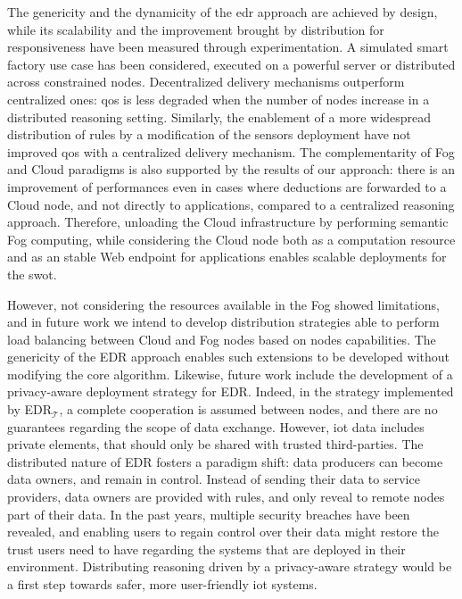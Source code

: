 \documentclass{iosart2c}
\newcommand{\edr}{EDR\xspace}
\newcommand{\edrt}{EDR$_{\mathcal{T}}$\xspace}
\begin{document}
The genericity and the dynamicity of the \gls{edr} approach are achieved by design, while its scalability and the improvement brought by distribution for responsiveness have been measured through experimentation.
A simulated smart factory use case has been considered, executed on a powerful server or distributed across constrained nodes.
Decentralized delivery mechanisms outperform centralized ones: \gls{qos} is less degraded when the number of nodes increase in a distributed reasoning setting.
Similarly, the enablement of a more widespread distribution of rules by a modification of the sensors deployment have not improved \gls{qos} with a centralized delivery mechanism.
The complementarity of Fog and Cloud paradigms is also supported by the results of our approach: there is an improvement of performances even in cases where deductions are forwarded to a Cloud node, and not directly to applications, compared to a centralized reasoning approach.
Therefore, unloading the Cloud infrastructure by performing semantic Fog computing, while considering the Cloud node both as a computation resource and as an stable Web endpoint for applications enables scalable deployments for the \gls{swot}.

However, not considering the resources available in the Fog showed limitations, and in future work we intend to develop distribution strategies able to perform load balancing between Cloud and Fog nodes based on nodes capabilities.
The genericity of the \edr approach enables such extensions to be developed without modifying the core algorithm.
Likewise, future work include the development of a privacy-aware deployment strategy for \edr.
Indeed, in the strategy implemented by \edrt, a complete cooperation is assumed between nodes, and there are no guarantees regarding the scope of data exchange.
However, \gls{iot} data includes private elements, that should only be shared with trusted third-parties.
The distributed nature of \edr fosters a paradigm shift: data producers can become data owners, and remain in control. 
Instead of sending their data to service providers, data owners are provided with rules, and only reveal to remote nodes part of their data.
In the past years, multiple security breaches have been revealed, and enabling users to regain control over their data might restore the trust users need to have regarding the systems that are deployed in their environment.
Distributing reasoning driven by a privacy-aware strategy would be a first step towards safer, more user-friendly \gls{iot} systems.




\end{document}

